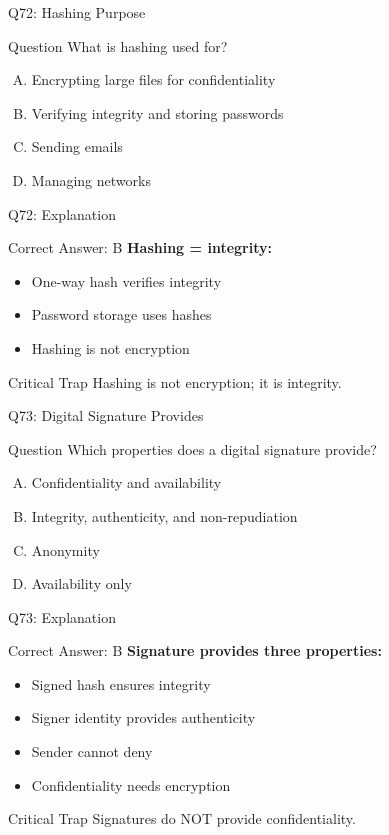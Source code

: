 \documentclass{beamer}
\begin{document}
	\begin{frame}{Q72: Hashing Purpose}
		\begin{block}{Question}
			What is hashing used for?
		\end{block}
		\begin{enumerate}[(A)]
			\item Encrypting large files for confidentiality
			\item Verifying integrity and storing passwords
			\item Sending emails
			\item Managing networks
		\end{enumerate}
	\end{frame}
	
	\begin{frame}{Q72: Explanation}
		\begin{block}{Correct Answer: B}
			\textbf{Hashing = integrity:}
			\begin{itemize}
				\item One-way hash verifies integrity
				\item Password storage uses hashes
				\item Hashing is not encryption
			\end{itemize}
		\end{block}
		\begin{alertblock}{Critical Trap}
			Hashing is not encryption; it is integrity.
		\end{alertblock}
	\end{frame}
	
	\begin{frame}{Q73: Digital Signature Provides}
		\begin{block}{Question}
			Which properties does a digital signature provide?
		\end{block}
		\begin{enumerate}[(A)]
			\item Confidentiality and availability
			\item Integrity, authenticity, and non-repudiation
			\item Anonymity
			\item Availability only
		\end{enumerate}
	\end{frame}
	
	\begin{frame}{Q73: Explanation}
		\begin{block}{Correct Answer: B}
			\textbf{Signature provides three properties:}
			\begin{itemize}
				\item Signed hash ensures integrity
				\item Signer identity provides authenticity
				\item Sender cannot deny
				\item Confidentiality needs encryption
			\end{itemize}
		\end{block}
		\begin{alertblock}{Critical Trap}
			Signatures do NOT provide confidentiality.
		\end{alertblock}
	\end{frame}
	
\end{document}
